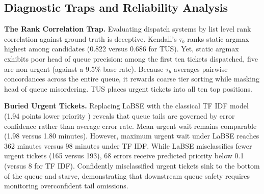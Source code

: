 \subsection{Diagnostic Traps and Reliability Analysis}

\textbf{The Rank Correlation Trap.} Evaluating dispatch systems by list level rank correlation against ground truth is deceptive. Kendall's $\tau_b$ ranks static argmax highest among candidates (0.822 versus 0.686 for TUS). Yet, static argmax exhibits poor head of queue precision: among the first ten tickets dispatched, five are non urgent (against a 9.5\% base rate). Because $\tau_b$ averages pairwise concordances across the entire queue, it rewards coarse tier sorting while masking head of queue misordering. TUS places urgent tickets into all ten top positions.

\textbf{Buried Urgent Tickets.} Replacing LaBSE with the classical TF IDF model (1.94 points lower priority \macrof{}) reveals that queue tails are governed by error confidence rather than average error rate. Mean urgent wait remains comparable (1.98 versus 1.80 minutes). However, maximum urgent wait under LaBSE reaches 362 minutes versus 98 minutes under TF IDF. While LaBSE misclassifies fewer urgent tickets (165 versus 193), 68 errors receive predicted priority below 0.1 (versus 8 for TF IDF). Confidently misclassified urgent tickets sink to the bottom of the queue and starve, demonstrating that downstream queue safety requires monitoring overconfident tail omissions.
